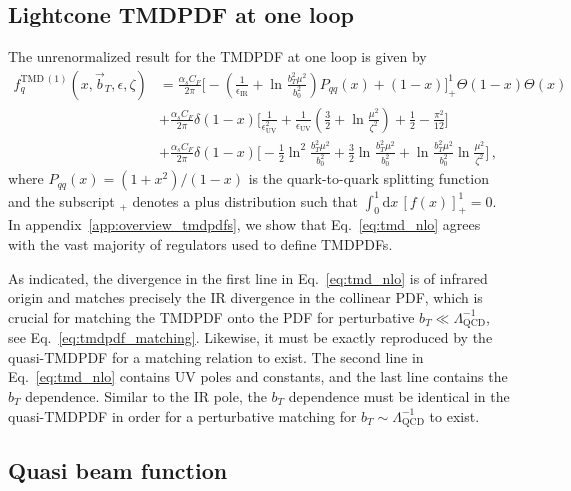 \documentclass[11pt,a4paper]{article}
\DeclareRobustCommand{\eq}[1]{Eq.~\eqref{eq:#1}}
\DeclareRobustCommand{\app}[1]{appendix~\ref{app:#1}}
\newcommand{\df}{\mathrm{d}}
\newcommand{\eps}{\epsilon}
\newcommand{\nn}{\nonumber}
\newcommand{\as}{\alpha_s}
\newcommand{\LQCD}{\Lambda_\mathrm{QCD}}
\newcommand{\UV}{\mathrm{UV}}
\newcommand{\IR}{\mathrm{IR}}
\newcommand\TMD{\mathrm{TMD}}
\newcommand{\Lb}[1]{\ln^{#1}\frac{b_T^2 \mu^2}{b_0^2}}
\newcommand{\bt}{\vec b_T}
\begin{document}
\subsection{Lightcone TMDPDF at one loop}
\label{sec:tmdpdf_nlo}
The unrenormalized result for the TMDPDF at one loop is given by
\begin{align} \label{eq:tmd_nlo}
 f_q^{\TMD\,(1)}(x, \bt, \eps, \zeta) &
 = \frac{\as C_F}{2\pi} \biggl[ - \left(\frac{1}{\eps_\IR} + \Lb{} \right) P_{qq}(x) + (1-x) \biggr]_+^1\Theta(1-x) \Theta(x)
 \nn\\&
  + \frac{\as C_F}{2\pi} \delta(1-x) \Biggl[ \frac{1}{\eps_\UV^2}
   + \frac{1}{\eps_\UV} \left(\frac{3}{2} + \ln\frac{\mu^2}{\zeta^2} \right)
   + \frac{1}{2} - \frac{\pi^2}{12} \Biggr]
 \nn\\&
  + \frac{\as C_F}{2\pi} \delta(1-x) \Biggl[
  - \frac{1}{2} \Lb{2} + \frac{3}{2} \Lb{}
  + \Lb{} \ln\frac{\mu^2}{\zeta^2} \Biggr]
\,,\end{align}
where $P_{qq}(x) = (1+x^2)/(1-x)$ is the quark-to-quark splitting function
and the subscript $_+$ denotes a plus distribution such that $\int_0^1 \df x \, [f(x)]_+^1 = 0$.
In \app{overview_tmdpdfs}, we show that \eq{tmd_nlo} agrees with the vast majority of regulators used to define TMDPDFs.

As indicated, the divergence in the first line in \eq{tmd_nlo} is of infrared origin
and matches precisely the IR divergence in the collinear PDF,
which is crucial for matching the TMDPDF onto the PDF for perturbative $b_T \ll \LQCD^{-1}$, see \eq{tmdpdf_matching}.
Likewise, it must be exactly reproduced by the quasi-TMDPDF for a matching relation to exist.
The second line in \eq{tmd_nlo} contains UV poles and constants,
and the last line contains the $b_T$ dependence.
Similar to the IR pole, the $b_T$ dependence must be identical in the quasi-TMDPDF
in order for a perturbative matching for $b_T \sim \LQCD^{-1}$ to exist.

\subsection{Quasi beam function}
\label{sec:qbeam_nlo}
\end{document}
